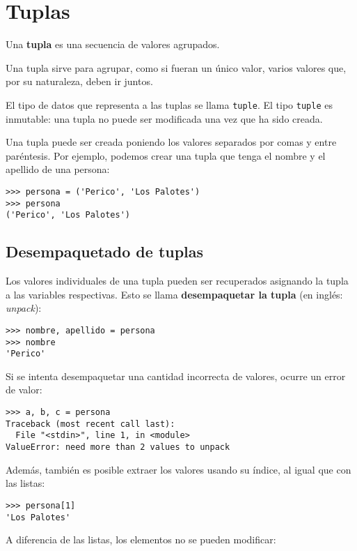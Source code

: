\section{Tuplas}

Una \textbf{tupla} es una secuencia de valores agrupados.

Una tupla sirve para agrupar, como si fueran un único valor, varios
valores que, por su naturaleza, deben ir juntos.

El tipo de datos que representa a las tuplas se llama \lstinline!tuple!.
El tipo \lstinline!tuple! es inmutable: una tupla no puede ser
modificada una vez que ha sido creada.

Una tupla puede ser creada poniendo los valores separados por comas y
entre paréntesis. Por ejemplo, podemos crear una tupla que tenga el
nombre y el apellido de una persona:

\begin{lstlisting}
>>> persona = ('Perico', 'Los Palotes')
>>> persona
('Perico', 'Los Palotes')
\end{lstlisting}

\subsection{Desempaquetado de tuplas}

Los valores individuales de una tupla pueden ser recuperados asignando
la tupla a las variables respectivas. Esto se llama
\textbf{desempaquetar la tupla} (en inglés: \emph{unpack}):

\begin{lstlisting}
>>> nombre, apellido = persona
>>> nombre
'Perico'
\end{lstlisting}

Si se intenta desempaquetar una cantidad incorrecta de valores, ocurre
un error de valor:

\begin{lstlisting}
>>> a, b, c = persona
Traceback (most recent call last):
  File "<stdin>", line 1, in <module>
ValueError: need more than 2 values to unpack
\end{lstlisting}

Además, también es posible extraer los valores usando su índice, al
igual que con las listas:

\begin{lstlisting}
>>> persona[1]
'Los Palotes'
\end{lstlisting}

A diferencia de las listas, los elementos no se pueden modificar:


